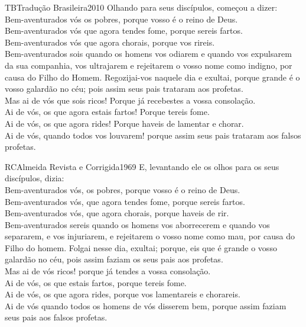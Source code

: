 \begin{traducao}{TB}{Tradução Brasileira}{2010}
Olhando para seus discípulos, começou a dizer:\\
Bem-aventurados vós os pobres, porque vosso é o reino de Deus.\\
Bem-aventurados vós que agora tendes fome, porque sereis fartos.\\
Bem-aventurados vós que agora chorais, porque vos rireis.\\
Bem-aventurados sois quando os homens vos odiarem e quando vos
expulsarem da sua companhia, vos ultrajarem e rejeitarem o vosso nome como
indigno, por causa do Filho do Homem. Regozijai-vos naquele dia e
exultai, porque grande é o vosso galardão no céu; pois assim seus pais
trataram aos profetas.\\
Mas ai de vós que sois ricos! Porque já recebestes a vossa consolação.\\
Ai de vós, os que agora estais fartos! Porque tereis fome.\\
Ai de vós, os que agora rides! Porque haveis de lamentar e chorar.\\
Ai de vós, quando todos vos louvarem! porque assim seus pais trataram
aos falsos profetas.
\end{traducao}

\begin{traducao}{RC}{Almeida Revista e Corrigida}{1969}
E, levantando ele os olhos para os seus discípulos, dizia:\\
Bem-aventurados vós, os pobres, porque vosso é o reino de Deus.\\
Bem-aventurados vós, que agora tendes fome, porque sereis fartos.\\
Bem-aventurados vós, que agora chorais, porque haveis de rir.\\
Bem-aventurados sereis quando os homens vos aborrecerem e quando vos
separarem, e vos injuriarem, e rejeitarem o vosso nome como mau, por causa do
Filho do homem. Folgai nesse dia, exultai; porque, eis que é grande o
vosso galardão no céu, pois assim faziam os seus pais aos profetas.\\
Mas ai de vós ricos! porque já tendes a vossa consolação.\\
Ai de vós, os que estais fartos, porque tereis fome.\\
Ai de vós, os que agora rides, porque vos lamentareis e chorareis.\\
Ai de vós quando todos os homens de vós disserem bem, porque assim
faziam seus pais aos falsos profetas.
\end{traducao}

